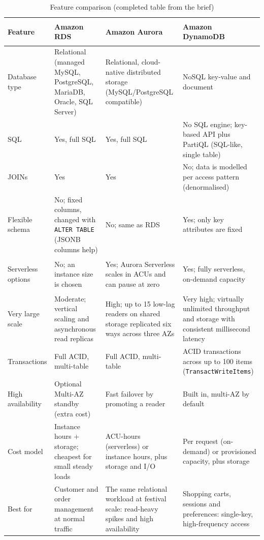 \documentclass[11pt,a4paper]{article}
\begin{document}
\begin{table}[H]
\centering\footnotesize
\renewcommand{\arraystretch}{1.25}
\begin{tabularx}{\linewidth}{@{}>{\bfseries\raggedright\arraybackslash}p{2.3cm} Y Y Y@{}}
\toprule
Feature & \textbf{\color{dsrds}Amazon RDS} & \textbf{\color{dswriter}Amazon Aurora} & \textbf{\color{dsddb}Amazon DynamoDB}\\
\midrule
Database type & Relational (managed MySQL, PostgreSQL, MariaDB, Oracle, SQL Server) & Relational, cloud-native distributed storage (MySQL/PostgreSQL compatible) & NoSQL key-value and document\\
SQL & Yes, full SQL & Yes, full SQL & No SQL engine; key-based API plus PartiQL (SQL-like, single table)\\
JOINs & Yes & Yes & No; data is modelled per access pattern (denormalised)\\
Flexible schema & No; fixed columns, changed with \texttt{ALTER TABLE} (JSONB columns help) & No; same as RDS & Yes; only key attributes are fixed\\
Serverless options & No; an instance size is chosen & Yes; Aurora Serverless scales in ACUs and can pause at zero & Yes; fully serverless, on-demand capacity\\
Very large scale & Moderate; vertical scaling and asynchronous read replicas & High; up to 15 low-lag readers on shared storage replicated six ways across three AZs & Very high; virtually unlimited throughput and storage with consistent millisecond latency\\
Transactions & Full ACID, multi-table & Full ACID, multi-table & ACID transactions across up to 100 items (\texttt{TransactWriteItems})\\
High availability & Optional Multi-AZ standby (extra cost) & Fast failover by promoting a reader & Built in, multi-AZ by default\\
Cost model & Instance hours + storage; cheapest for small steady loads & ACU-hours (serverless) or instance hours, plus storage and I/O & Per request (on-demand) or provisioned capacity, plus storage\\
\midrule
Best for & Customer and order management at normal traffic & The same relational workload at festival scale: read-heavy spikes and high availability & Shopping carts, sessions and preferences: single-key, high-frequency access\\
\bottomrule
\end{tabularx}
\caption{Feature comparison (completed table from the brief)}
\label{tab:compare}
\end{table}
\end{document}
